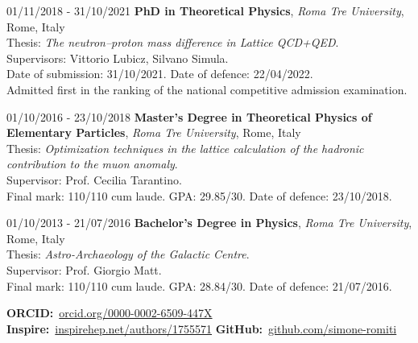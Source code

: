 \begin{cvlist}
\item[01/11/2018 - 31/10/2021] \textbf{PhD in Theoretical Physics}, \textit{Roma Tre University}, Rome, Italy\\
Thesis: \textit{The neutron--proton mass difference in Lattice QCD+QED}.\\
Supervisors: Vittorio Lubicz, Silvano Simula.\\
Date of submission: 31/10/2021. Date of defence: 22/04/2022.\\
Admitted first in the ranking of the national competitive admission examination.

\item[01/10/2016 - 23/10/2018] \textbf{Master's Degree in Theoretical Physics of Elementary Particles},
\textit{Roma Tre University}, Rome, Italy\\
Thesis: \textit{Optimization techniques in the lattice calculation of the hadronic contribution to the muon
anomaly}.\\
Supervisor: Prof. Cecilia Tarantino.\\
Final mark: 110/110 cum laude. GPA: 29.85/30. Date of defence: 23/10/2018.

\item[01/10/2013 - 21/07/2016] \textbf{Bachelor's Degree in Physics}, \textit{Roma Tre University}, Rome, Italy\\
Thesis: \textit{Astro-Archaeology of the Galactic Centre}.\\
Supervisor: Prof. Giorgio Matt.\\
Final mark: 110/110 cum laude. GPA: 28.84/30. Date of defence: 21/07/2016.
\end{cvlist}


{\raggedright\noindent\textbf{ORCID:}~\href{https://orcid.org/0000-0002-6509-447X}{orcid.org/0000-0002-6509-447X}\quad
\textbf{Inspire:}~\href{https://inspirehep.net/authors/1755571}{inspirehep.net/authors/1755571}\quad
\textbf{GitHub:}~\href{https://github.com/simone-romiti}{github.com/simone-romiti}\par}


